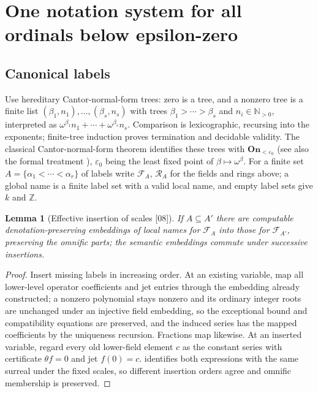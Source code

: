 \documentclass[11pt,oneside]{article}
\numberwithin{equation}{section}
\newtheorem{lemma}[lemma]{Lemma}
\theoremstyle{definition}
\theoremstyle{remark}
\newcommand{\On}{\mathbf{On}}
\newcommand{\N}{\mathbb N}
\newcommand{\Z}{\mathbb Z}
\newcommand{\src}[1]{\textup{\textsf{\small[#1]}}}
\begin{document}
\section{One notation system for all ordinals below epsilon-zero}\label{onot:hol:sec:epsilon}

\subsection{Canonical labels}

Use hereditary Cantor-normal-form trees: zero is a tree, and a nonzero tree is a
finite list $(\beta_1,n_1),\ldots,(\beta_s,n_s)$ with trees
$\beta_1>\cdots>\beta_s$ and $n_i\in\N_{>0}$, interpreted as
$\omega^{\beta_1}n_1+\cdots+\omega^{\beta_s}n_s$. Comparison is lexicographic,
recursing into the exponents; finite-tree induction proves termination and
decidable validity. The classical Cantor-normal-form theorem identifies these
trees with $\On_{<\varepsilon_0}$ (see also the formal treatment \cite{Bancerek}),
$\varepsilon_0$ being the least fixed point of $\beta\mapsto\omega^\beta$. For a
finite set $A=\{\alpha_1<\cdots<\alpha_r\}$ of labels write $\mathcal F_A$,
$\mathcal R_A$ for the fields and rings above; a global name is a finite label set
with a valid local name, and empty label sets give $k$ and $\Z$.

\begin{lemma}[Effective insertion of scales \src{08}]\label{onot:hol:lem:insert}
If $A\subseteq A'$ there are computable denotation-preserving embeddings of local
names for $\mathcal F_A$ into those for $\mathcal F_{A'}$, preserving the omnific
parts; the semantic embeddings commute under successive insertions.
\end{lemma}
\begin{proof}
Insert missing labels in increasing order. At an existing variable, map all
lower-level operator coefficients and jet entries through the embedding already
constructed; a nonzero polynomial stays nonzero and its ordinary integer roots
are unchanged under an injective field embedding, so the exceptional bound and
compatibility equations are preserved, and the induced series has the mapped
coefficients by the uniqueness recursion. Fractions map likewise. At an inserted
variable, regard every old lower-field element $c$ as the constant series with
certificate $\theta f=0$ and jet $f(0)=c$. 
identifies both expressions with the same surreal under the fixed scales, so
different insertion orders agree and omnific membership is preserved.
\end{proof}
\end{document}
